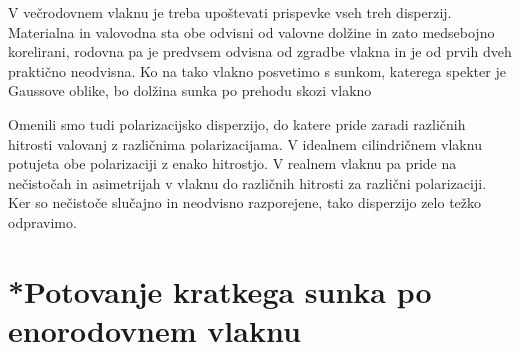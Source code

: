 V večrodovnem vlaknu je treba upoštevati prispevke vseh treh disperzij. Materialna
in valovodna sta obe odvisni od valovne dolžine in zato medsebojno korelirani, rodovna pa 
je predvsem odvisna od zgradbe vlakna in je od prvih dveh praktično neodvisna. Ko na 
tako vlakno posvetimo s sunkom, katerega spekter je Gaussove oblike, bo dolžina 
sunka po prehodu skozi vlakno

\begin{remark}
 Omenili smo tudi polarizacijsko disperzijo, do katere pride zaradi različnih hitrosti valovanj
 z različnima polarizacijama. V idealnem cilindričnem vlaknu potujeta obe polarizaciji
 z enako hitrostjo. V realnem vlaknu pa 
 pride na nečistočah in asimetrijah v vlaknu do različnih hitrosti za različni polarizaciji. 
 Ker so nečistoče slučajno in neodvisno razporejene, tako disperzijo zelo težko odpravimo.
\end{remark}

\section{*Potovanje kratkega sunka po enorodovnem vlaknu}
\label{chap:sunvl}
